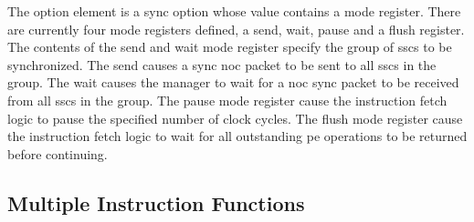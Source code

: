 The option element is a sync option whose value contains a mode register.
There are currently four mode registers defined, a send, wait, pause and a flush register.
The contents of the send and wait mode register specify the group of \acp{ssc} to be synchronized. 
The send causes a sync \ac{noc} packet to be sent to all \acp{ssc} in the group.
The wait causes the manager to wait for a \ac{noc} sync packet to be received from all \acp{ssc} in the group.
The pause mode register cause the instruction fetch logic to pause the specified number of clock cycles.
The flush mode register cause the instruction fetch logic to wait for all outstanding \ac{pe} operations to be returned before continuing.

\subsection{Multiple Instruction Functions}
\label{sec:Multiple Instruction Functions}





